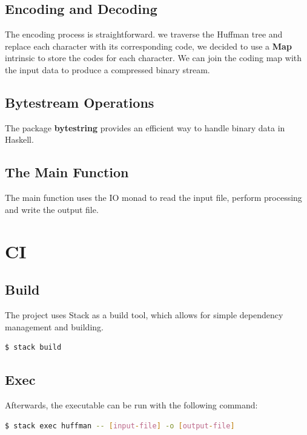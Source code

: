 \documentclass{article}
\begin{document}
\subsection{Encoding and Decoding}

The encoding process is straightforward. we traverse the Huffman tree and replace each character with its corresponding code,
we decided to use a \textbf{Map} intrinsic to store the codes for each character. 
We can join the coding map with the input data to produce a compressed binary stream.

\subsection{Bytestream Operations}

The package \textbf{bytestring} provides an efficient way to handle binary data in Haskell.

\subsection{The Main Function}

The main function uses the IO monad to read the input file, perform processing and write the output file.

\section{CI}

\subsection{Build}

The project uses Stack as a build tool, which allows for simple dependency management and building.

\begin{lstlisting}[language=bash]
$ stack build
\end{lstlisting}

\subsection{Exec}

Afterwards, the executable can be run with the following command:

\begin{lstlisting}[language=bash]
$ stack exec huffman -- [input-file] -o [output-file]
\end{lstlisting}
\end{document}
